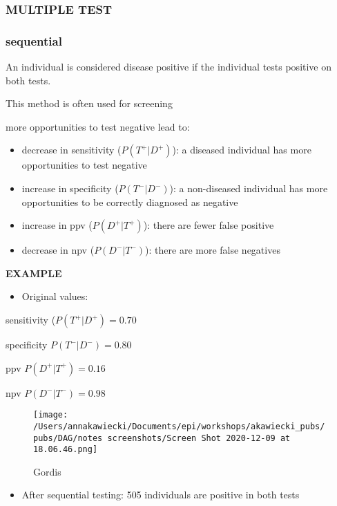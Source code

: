 \documentclass[
]{article}
\providecommand{\tightlist}{%
  \setlength{\itemsep}{0pt}\setlength{\parskip}{0pt}}
\begin{document}
\hypertarget{multiple-test}{%
\subsubsection{MULTIPLE TEST}\label{multiple-test}}

\hypertarget{sequential}{%
\subsubsection{sequential}\label{sequential}}

An individual is considered disease positive if the individual tests
positive on both tests.

This method is often used for screening

more opportunities to test negative lead to:

\begin{itemize}
\item
  decrease in sensitivity (\(P(T^+|D^+)\)): a diseased individual has
  more opportunities to test negative
\item
  increase in specificity (\(P(T^-|D^-)\)): a non-diseased individual
  has more opportunities to be correctly diagnosed as negative
\item
  increase in ppv (\(P(D^+|T^+)\)): there are fewer false positive
\item
  decrease in npv (\(P(D^-|T^-)\)): there are more false negatives
\end{itemize}

\textbf{EXAMPLE}

\begin{itemize}
\tightlist
\item
  Original values:
\end{itemize}

sensitivity (\(P(T^+|D^+)= 0.70\)

specificity \(P(T^-|D^-) = 0.80\)

ppv \(P(D^+|T^+)= 0.16\)

npv \(P(D^-|T^-) = 0.98\)

\begin{figure}
\centering
\texttt{[image: /Users/annakawiecki/Documents/epi/workshops/akawiecki\_pubs/pubs/DAG/notes screenshots/Screen Shot 2020-12-09 at 18.06.46.png]}
\caption{Gordis}
\end{figure}

\begin{itemize}
\tightlist
\item
  After sequential testing: 505 individuals are positive in both tests
\end{itemize}
\end{document}
